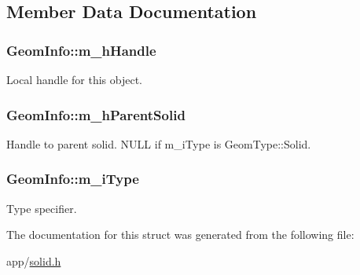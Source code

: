 \subsection{Member Data Documentation}
\hypertarget{struct_geom_info_a38fdd8d03050ce8b279b313eb53a7862}{
\subsubsection[{m\-\_\-h\-Handle}]{ Geom\-Info\-::m\-\_\-h\-Handle}}\label{struct_geom_info_a38fdd8d03050ce8b279b313eb53a7862}
Local handle for this object. \hypertarget{struct_geom_info_aa929dea8b11f72ae4489e73ef8f60f7a}{
\subsubsection[{m\-\_\-h\-Parent\-Solid}]{ Geom\-Info\-::m\-\_\-h\-Parent\-Solid}}\label{struct_geom_info_aa929dea8b11f72ae4489e73ef8f60f7a}
Handle to parent solid. N\-U\-L\-L if m\-\_\-i\-Type is Geom\-Type\-::\-Solid. \hypertarget{struct_geom_info_a39b0270c2fa75ee91a7b43349440974d}{
\subsubsection[{m\-\_\-i\-Type}]{ Geom\-Info\-::m\-\_\-i\-Type}}\label{struct_geom_info_a39b0270c2fa75ee91a7b43349440974d}
Type specifier. 

The documentation for this struct was generated from the following file\-:\begin{DoxyCompactItemize}
\item 
app/\hyperlink{solid_8h}{solid.\-h}\end{DoxyCompactItemize}
